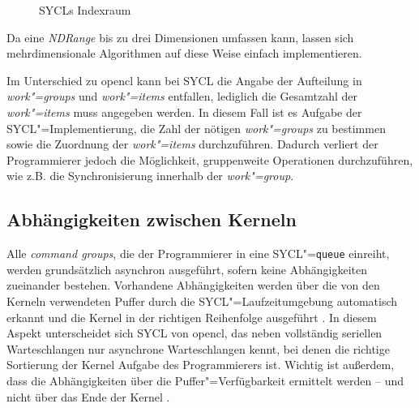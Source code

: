 \begin{figure}
    \caption{SYCLs Indexraum \cite[nach][25]{opencl2012}}
    \label{sycl:konzepte:abstraktion:ndrange}
\end{figure}

Da eine \textit{NDRange} bis zu drei Dimensionen umfassen kann, lassen sich
mehrdimensionale Algorithmen auf diese Weise einfach implementieren.

Im Unterschied zu \gls{opencl} kann bei SYCL die Angabe der Aufteilung in
\textit{work"=groups} und \textit{work"=items} entfallen, lediglich die
Gesamtzahl der \textit{work"=items} muss angegeben werden. In diesem Fall ist
es Aufgabe der SYCL"=Implementierung, die Zahl der nötigen \textit{work"=groups}
zu bestimmen sowie die Zuordnung der \textit{work"=items} durchzuführen. Dadurch
verliert der Programmierer jedoch die Möglichkeit, gruppenweite Operationen
durchzuführen, wie z.B. die Synchronisierung innerhalb der \textit{work"=group}.

\subsection{Abhängigkeiten zwischen Kerneln}
\label{sycl:konzepte:abhaengigkeiten}

Alle \textit{command groups}, die der Programmierer in eine
SYCL"=\texttt{queue} einreiht, werden grundsätzlich asynchron ausgeführt, sofern
keine Abhängigkeiten zueinander bestehen. Vorhandene Abhängigkeiten werden über
die von den Kerneln verwendeten Puffer durch die SYCL"=Laufzeitumgebung
automatisch erkannt und die Kernel in der richtigen Reihenfolge ausgeführt
\cite[vgl.][21--23]{sycl2019}. In diesem Aspekt unterscheidet sich SYCL von
\gls{opencl}, das neben vollständig seriellen Warteschlangen nur asynchrone
Warteschlangen kennt, bei denen die richtige Sortierung der Kernel Aufgabe des
Programmierers ist. Wichtig ist außerdem, dass die Abhängigkeiten über die
Puffer"=Verfügbarkeit ermittelt werden -- und nicht über das Ende der Kernel
\cite[vgl.][166]{sycl2019}.

